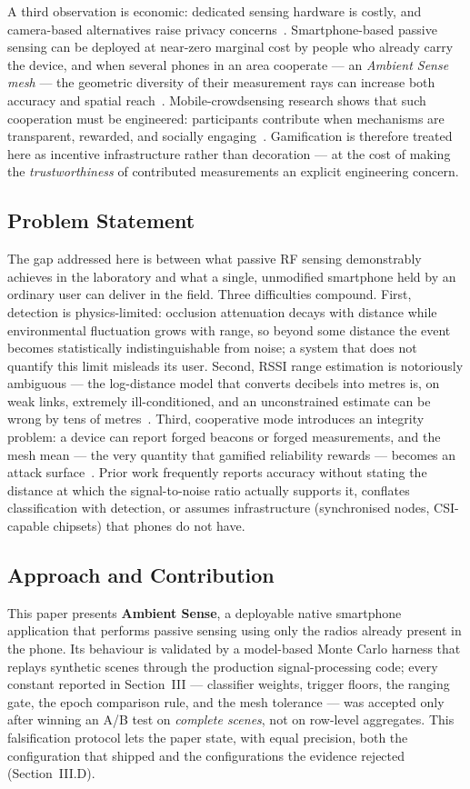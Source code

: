 \documentclass[journal,10pt]{IEEEtran}
\begin{document}
A third observation is economic: dedicated sensing hardware is costly, and
camera-based alternatives raise privacy concerns~\cite{khan2023,zhou2020,dmip2023}.
Smartphone-based passive sensing can be deployed at near-zero marginal cost
by people who already carry the device, and when several phones in an area
cooperate --- an \emph{Ambient Sense mesh} --- the geometric diversity of
their measurement rays can increase both accuracy and spatial
reach~\cite{li2024}. Mobile-crowdsensing research shows that such
cooperation must be engineered: participants contribute when mechanisms are
transparent, rewarded, and socially engaging~\cite{zhang2022,wang2018}.
Gamification is therefore treated here as incentive infrastructure rather
than decoration --- at the cost of making the \emph{trustworthiness} of
contributed measurements an explicit engineering concern.

\subsection{Problem Statement}
The gap addressed here is between what passive RF sensing demonstrably
achieves in the laboratory and what a single, unmodified smartphone held by
an ordinary user can deliver in the field. Three difficulties compound.
First, detection is physics-limited: occlusion attenuation decays with
distance while environmental fluctuation grows with range, so beyond some
distance the event becomes statistically indistinguishable from noise; a
system that does not quantify this limit misleads its user. Second, RSSI
range estimation is notoriously ambiguous --- the log-distance model that
converts decibels into metres is, on weak links, extremely ill-conditioned,
and an unconstrained estimate can be wrong by tens of
metres~\cite{ramirez2021,milano2024}. Third, cooperative mode introduces an
integrity problem: a device can report forged beacons or forged
measurements, and the mesh mean --- the very quantity that gamified
reliability rewards --- becomes an attack
surface~\cite{casar2022,antonioli2020}. Prior work frequently reports
accuracy without stating the distance at which the signal-to-noise ratio
actually supports it, conflates classification with detection, or assumes
infrastructure (synchronised nodes, CSI-capable chipsets) that phones do not
have.

\subsection{Approach and Contribution}
This paper presents \textbf{Ambient Sense}, a deployable native smartphone
application that performs passive sensing using only the radios already
present in the phone. Its behaviour is validated by a model-based Monte
Carlo harness that replays synthetic scenes through the production
signal-processing code; every constant reported in Section~III --- classifier
weights, trigger floors, the ranging gate, the epoch comparison rule, and the
mesh tolerance --- was accepted only after winning an A/B test on
\emph{complete scenes}, not on row-level aggregates. This falsification
protocol lets the paper state, with equal precision, both the configuration
that shipped and the configurations the evidence rejected (Section~III.D).
\end{document}
